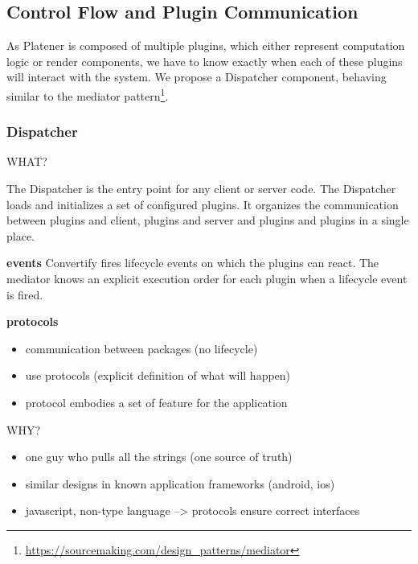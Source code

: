 \documentclass[../ClassicThesis.tex]{subfiles}
\begin{document}
\subsection{Control Flow and Plugin Communication}

As Platener is composed of multiple plugins, which either represent computation
logic or render components, we have to know exactly when each of these plugins
will interact with the system. We propose a Dispatcher component, behaving
similar to the mediator
pattern\footnote{\url{https://sourcemaking.com/design_patterns/mediator}}.

\subsubsection{Dispatcher}

WHAT?

The Dispatcher is the entry point for any client or server code. The Dispatcher
loads and initializes a set of configured plugins. It organizes the
communication between plugins and client, plugins and server and plugins and
plugins in a single place.



\textbf{events} Convertify fires lifecycle events on which the plugins can
react. The mediator knows an explicit execution order for each plugin when a
lifecycle event is fired.

\textbf{protocols}
\begin{itemize}
\item communication between packages (no lifecycle)
\item use protocols (explicit definition of what will happen)
\item protocol embodies a set of feature for the application
\end{itemize}

WHY?

\begin{itemize}
\item one guy who pulls all the strings (one source of truth)
\item similar designs in known application frameworks (android, ios)
\item javascript, non-type language --> protocols ensure correct interfaces
\end{itemize}
\end{document}
